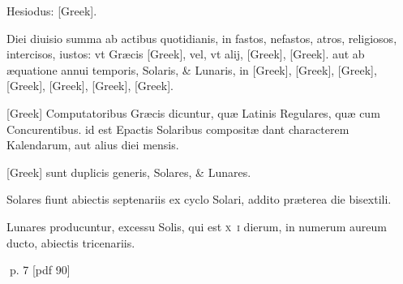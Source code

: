 \begin{parnumbers}
Hesiodus: \textgreek{[Greek]}.

Diei diuisio summa ab actibus quotidianis, in fastos, nefastos, atros, religiosos, intercisos, iustos: vt Græcis \textgreek{[Greek]}, vel, vt alij, \textgreek{[Greek]}, \textgreek{[Greek]}. aut ab æquatione annui temporis, Solaris, \& Lunaris, in \textgreek{[Greek]}, \textgreek{[Greek]}, \textgreek{[Greek]}, \textgreek{[Greek]}, \textgreek{[Greek]}, \textgreek{[Greek]}, \textgreek{[Greek]}.

\textgreek{[Greek]} Computatoribus Græcis dicuntur, quæ Latinis Regulares, quæ cum  Concurentibus. id est Epactis Solaribus compositæ dant characterem Kalendarum, aut alius diei mensis.

\textgreek{[Greek]} sunt duplicis generis, Solares, \& Lunares.

Solares fiunt abiectis septenariis ex cyclo Solari, addito præterea die bisextili.

Lunares producuntur, excessu Solis, qui est \textsc{x~i} dierum, in numerum aureum ducto, abiectis tricenariis.

\end{parnumbers}
\clearpage
p. 7 [pdf 90]

